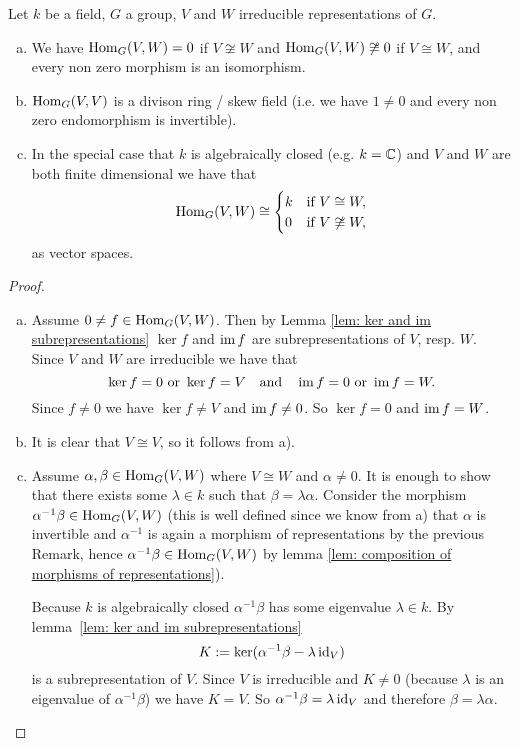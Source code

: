 \begin{lem}
 Let $k$ be a field, $G$ a group, $V$ and $W$ irreducible representations of $G$.
 \begin{enumerate}[a)]
  \item
  We have $\operatorname{Hom}_G(V,W) = 0$ if $V \not\cong W$ and $\operatorname{Hom}_G(V,W) \not\cong 0$ if $V \cong W$, and every non zero morphism is an isomorphism.
  \item
  $\operatorname{Hom}_G(V,V)$ is a divison ring / skew field (i.e. we have $1 \neq 0$ and every non zero endomorphism is invertible).
  \item
  In the special case that $k$ is algebraically closed (e.g. $k = \mathbb{C}$) and $V$ and $W$ are both finite dimensional we have that
  \[
   \operatorname{Hom}_G(V,W) \cong
   \begin{cases}
    k & \text{if } V \cong W, \\
    0 & \text{if } V \not\cong W,
   \end{cases}
  \]
  as vector spaces.
 \end{enumerate}
\end{lem}
\begin{proof}
 \begin{enumerate}[a)]
  \item 
  Assume $0 \neq f \in \operatorname{Hom}_G(V,W)$. Then by Lemma \ref{lem: ker and im subrepresentations} $\ker f$ and $\operatorname{im} f$ are subrepresentations of $V$, resp. $W$. Since $V$ and $W$ are irreducible we have that
  \[
   \ker f = 0 \text{ or } \ker f = V \quad \text{and} \quad \operatorname{im} f = 0 \text{ or } \operatorname{im} f = W.
  \]
  Since $f \neq 0$ we have $\ker f \neq V$ and $\operatorname{im} f \neq 0$. So $\ker f = 0$ and $\operatorname{im} f = W$.
  \item
  It is clear that $V \cong V$, so it follows from a).
  \item
  Assume $\alpha, \beta \in \operatorname{Hom}_G(V,W)$ where $V \cong W$ and $\alpha \neq 0$. It is enough to show that there exists some $\lambda \in k$ such that $\beta = \lambda \alpha$. Consider the morphism $\alpha^{-1} \beta \in \operatorname{Hom}_G(V,W)$ (this is well defined since we know from a) that $\alpha$ is invertible and $\alpha^{-1}$ is again a morphism of representations by the previous Remark, hence $\alpha^{-1} \beta \in \operatorname{Hom}_G(V,W)$ by lemma \ref{lem: composition of morphisms of representations}).
  
  Because $k$ is algebraically closed $\alpha^{-1} \beta$ has some eigenvalue $\lambda \in k$. By \mbox{lemma \ref{lem: ker and im subrepresentations}}
  \[
   K := \ker(\alpha^{-1} \beta - \lambda \operatorname{id}_V)
  \]
  is a subrepresentation of $V$. Since $V$ is irreducible and $K \neq 0$ (because $\lambda$ is an eigenvalue of $\alpha^{-1} \beta$) we have $K = V$. So $\alpha^{-1} \beta = \lambda \operatorname{id}_V$ and therefore $\beta = \lambda \alpha$. \qedhere
 \end{enumerate}
\end{proof}


